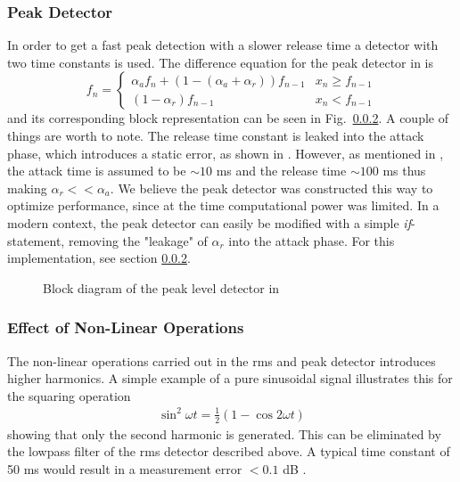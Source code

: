\documentclass[../main2.tex]{subfiles}
\providecommand{\rootdir}{..}
\begin{document}
\subsubsection{Peak Detector}
In order to get a fast peak detection with a slower release time a detector with two time constants is used. The difference equation for the peak detector in \cite{mcnally1984dynamic} is
\begin{equation}
f_n = \begin{cases}
    \alpha_{a} f_n + (1- (\alpha_{a} + \alpha_{r})) f_{n-1}  	& x_n \geq f_{n-1} \\
    (1-\alpha_{r}) f_{n-1} 								& x_n < f_{n-1}
\end{cases}
\end{equation}
and its corresponding block representation can be seen in Fig.~\ref{}. A couple of things are worth to note. The release time constant is leaked into the attack phase, which introduces a static error, as shown in \cite{giannoulis2012}. However, as mentioned in \cite{mcnally1984dynamic}, the attack time is assumed to be $\sim 10$ ms and the release time   $\sim 100$ ms thus making $\alpha_r << \alpha_a$. We believe the peak detector was constructed this way to optimize performance, since at the time computational power was limited. In a modern context, the peak detector can easily be modified with a simple \emph{if}-statement, removing the "leakage" of $\alpha_r$ into the attack phase. For this implementation, see section \ref{}.
\begin{figure}
\centerline{}
\caption{Block diagram of the peak level detector in \cite{mcnally1984dynamic}}
\label{fig:block_mcnally_theory_rms}
\end{figure}
\subsubsection{Effect of Non-Linear Operations}
The non-linear operations carried out in the rms and peak detector introduces higher harmonics. A simple example of a pure sinusoidal signal illustrates this for the squaring operation
\begin{align}
\sin^2{\omega t} = \frac{1}{2}(1-\cos{2\omega t}) 
\end{align}
showing that only the second harmonic is generated. This can be eliminated by the lowpass filter of the rms detector described above. A typical time constant of 50 ms would result in a measurement error $< 0.1$ dB \cite{mcnally1984dynamic}.
\end{document}
